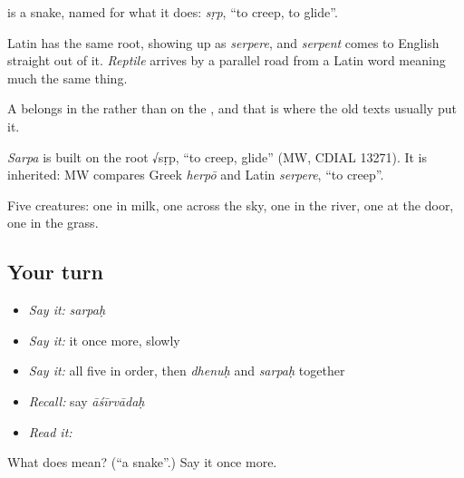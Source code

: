 \textbf{} is a snake, named for what it does: \emph{sṛp}, \textquotedblleft{}to creep, to glide\textquotedblright{}.

Latin has the same root, showing up as \emph{serpere}, and \emph{serpent} comes to English straight out of it. \emph{Reptile} arrives by a parallel road from a Latin word meaning much the same thing.

A \textbf{} belongs in the  rather than on the , and that is where the old texts usually put it.

\begin{cousinweb}
\emph{Sarpa} is built on the root √sṛp, \textquotedblleft{}to creep, glide\textquotedblright{} (MW, CDIAL 13271). It is inherited: MW compares Greek \emph{herpō} and Latin \emph{serpere}, \textquotedblleft{}to creep\textquotedblright{}.
\end{cousinweb}

\begin{grammarlens}[title={What you've built}]
Five creatures: one in milk, one across the sky, one in the river, one at the door, one in the grass.
\end{grammarlens}

\subsection*{Your turn}
\begin{itemize}
\raggedright
  \item \emph{Say it:} \emph{sarpaḥ}
  \item \emph{Say it:} it once more, slowly
  \item \emph{Say it:} all five in order, then \emph{dhenuḥ} and \emph{sarpaḥ} together
  \item \emph{Recall:} say \emph{āśīrvādaḥ}
  \item \emph{Read it:} \textbf{}
\end{itemize}

\begin{tcolorbox}[breakable,colback=teal!4,colframe=teal!35!black,title={Before you move on}]
What does  mean? (\textquotedblleft{}a snake\textquotedblright{}.) Say it once more.
\end{tcolorbox}

